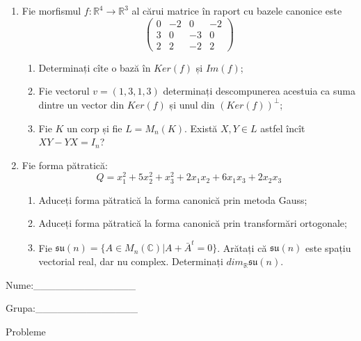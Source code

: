 \documentclass{article}
\begin{document}
\begin{enumerate}
 \item Fie morfismul $f:\mathbb{R}^4 \to \mathbb{R}^3$ al cărui matrice în raport cu bazele canonice este
$$\begin{pmatrix}
0&-2&0&-2\\
3&0&-3&0\\
2&2&-2&2
\end{pmatrix}$$

\begin{enumerate}
\item Determinați cîte o bază în $Ker(f)$ și $Im(f)$;
\item Fie vectorul $v=(1,3,1,3)$ determinați descompunerea acestuia ca suma dintre un vector din $Ker(f)$ și unul din $(Ker(f))^\perp$;
\item Fie $K$ un corp și fie $L=M_n(K)$. Există $X,Y \in L$ astfel încît $XY-YX=I_n$?  
\end{enumerate}
\item Fie forma pătratică:
$$Q= x_1^2+5x_2^2+x_3^2+2x_1x_2+6x_1x_3+2x_2x_3$$

\begin{enumerate}
\item Aduceți forma pătratică la forma canonică prin metoda Gauss;
\item Aduceți forma pătratică la forma canonică prin transformări ortogonale;
\item Fie $\mathfrak{su}(n)=\{ A \in M_n(\mathbb{C}) | A+\bar{A}^t=0\}$. Arătați că $\mathfrak{su}(n)$ este spațiu vectorial real, dar nu complex.
Determinați $dim_{\mathbb{R}}\mathfrak{su}(n)$.
\end{enumerate}
\end{enumerate}
\newpage
\begin{flushright}
Nume:\_\_\_\_\_\_\_\_\_\_\_\_\_\_
 
 
Grupa:\_\_\_\_\_\_\_\_\_\_\_\_\_\_
\end{flushright}
\begin{center}
\vspace{2cm}
{\Large Probleme}
\vspace{2cm}
\end{center}
\end{document}
